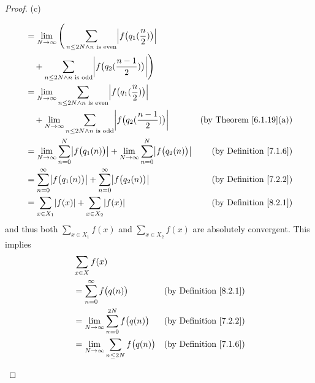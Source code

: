 \begin{proof}{(c)}
\begin{itemize}
\begin{align*}
                   & = \lim_{N \to \infty} \Bigg(\sum_{n \leq 2N \land n \text{ is even}} \abs*{f\big(q_1(\frac{n}{2})\big)}                                                               \\
                   & \quad + \sum_{n \leq 2N \land n \text{ is odd}} \abs*{f\big(q_2(\frac{n - 1}{2})\big)}\Bigg)                                                                          \\
                   & = \lim_{N \to \infty} \sum_{n \leq 2N \land n \text{ is even}} \abs*{f\big(q_1(\frac{n}{2})\big)}                                                                     \\
                   & \quad + \lim_{N \to \infty} \sum_{n \leq 2N \land n \text{ is odd}} \abs*{f\big(q_2(\frac{n - 1}{2})\big)}                  & \text{(by Theorem \ref{6.1.19}(a))}     \\
                   & = \lim_{N \to \infty} \sum_{n = 0}^N \abs*{f\big(q_1(n)\big)} + \lim_{N \to \infty} \sum_{n = 0}^N \abs*{f\big(q_2(n)\big)} & \text{(by Definition \ref{7.1.6})}      \\
                   & = \sum_{n = 0}^\infty \abs*{f\big(q_1(n)\big)} + \sum_{n = 0}^\infty \abs*{f\big(q_2(n)\big)}                               & \text{(by Definition \ref{7.2.2})}      \\
                   & = \sum_{x \in X_1} \abs*{f(x)} + \sum_{x \in X_2} \abs*{f(x)}                                                               & \text{(by Definition \ref{8.2.1})}
              \end{align*}
              and thus both \(\sum_{x \in X_1} f(x)\) and \(\sum_{x \in X_2} f(x)\) are absolutely convergent.
              This implies
              \begin{align*}
                   & \sum_{x \in X} f(x)                                                                                                                                     \\
                   & = \sum_{n = 0}^\infty f\big(q(n)\big)                                                                         & \text{(by Definition \ref{8.2.1})}      \\
                   & = \lim_{N \to \infty} \sum_{n = 0}^{2N} f\big(q(n)\big)                                                       & \text{(by Definition \ref{7.2.2})}      \\
                   & = \lim_{N \to \infty} \sum_{n \leq 2N} f\big(q(n)\big)                                                        & \text{(by Definition \ref{7.1.6})}      \\

\end{align*}
\end{itemize}
\end{proof}
